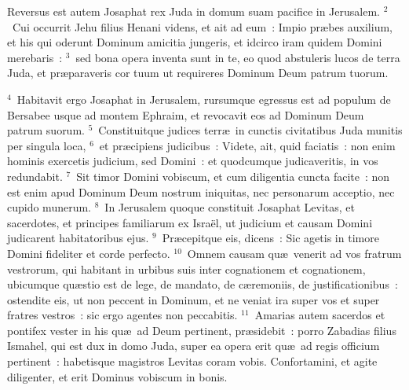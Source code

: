 \bchapter
\lettrine[lines=3,image=true,loversize=0.05,lraise=-0.03]{R}{}eversus est autem Josaphat rex Juda in domum suam pacifice in Jerusalem.
${}^{2}$~Cui occurrit Jehu filius Henani videns, et ait ad eum~: Impio pr\ae bes auxilium, et his qui oderunt Dominum amicitia jungeris, et idcirco iram quidem Domini merebaris~:
${}^{3}$~sed bona opera inventa sunt in te, eo quod abstuleris lucos de terra Juda, et pr\ae paraveris cor tuum ut requireres Dominum Deum patrum tuorum.


${}^{4}$~Habitavit ergo Josaphat in Jerusalem, rursumque egressus est ad populum de Bersabee usque ad montem Ephraim, et revocavit eos ad Dominum Deum patrum suorum.
${}^{5}$~Constituitque judices terr\ae\ in cunctis civitatibus Juda munitis per singula loca,
${}^{6}$~et pr\ae cipiens judicibus~: Videte, ait, quid faciatis~: non enim hominis exercetis judicium, sed Domini~: et quodcumque judicaveritis, in vos redundabit.
${}^{7}$~Sit timor Domini vobiscum, et cum diligentia cuncta facite~: non est enim apud Dominum Deum nostrum iniquitas, nec personarum acceptio, nec cupido munerum.
${}^{8}$~In Jerusalem quoque constituit Josaphat Levitas, et sacerdotes, et principes familiarum ex Isra\"el, ut judicium et causam Domini judicarent habitatoribus ejus.
${}^{9}$~Pr\ae cepitque eis, dicens~: Sic agetis in timore Domini fideliter et corde perfecto.
${}^{10}$~Omnem causam qu\ae\ venerit ad vos fratrum vestrorum, qui habitant in urbibus suis inter cognationem et cognationem, ubicumque qu\ae stio est de lege, de mandato, de c\ae remoniis, de justificationibus~: ostendite eis, ut non peccent in Dominum, et ne veniat ira super vos et super fratres vestros~: sic ergo agentes non peccabitis.
${}^{11}$~Amarias autem sacerdos et pontifex vester in his qu\ae\ ad Deum pertinent, pr\ae sidebit~: porro Zabadias filius Ismahel, qui est dux in domo Juda, super ea opera erit qu\ae\ ad regis officium pertinent~: habetisque magistros Levitas coram vobis. Confortamini, et agite diligenter, et erit Dominus vobiscum in bonis.

